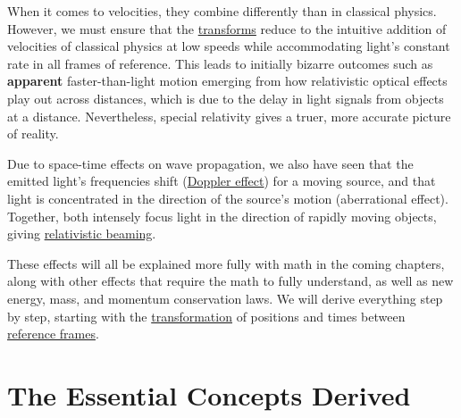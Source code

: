 When it comes to velocities, they combine differently than in classical physics.
However, we must ensure that the \hyperlink{def-transform}{transforms} reduce to the intuitive addition of velocities of classical physics at low speeds while accommodating light's constant rate in all frames of reference.
This leads to initially bizarre outcomes such as \textbf{apparent} faster-than-light motion emerging from how relativistic optical effects play out across distances, which is due to the delay in light signals from objects at a distance.
Nevertheless, special relativity gives a truer, more accurate picture of reality.

Due to space-time effects on wave propagation, we also have seen that the emitted light's frequencies shift (\hyperlink{def-doppler-effect}{Doppler effect}) for a moving source, and that light is concentrated in the direction of the source's motion (aberrational effect).
Together, both intensely focus light in the direction of rapidly moving objects, giving \hyperlink{def-relativistic-beaming}{relativistic beaming}.

These effects will all be explained more fully with math in the coming chapters, along with other effects that require the math to fully understand, as well as new energy, mass, and momentum conservation laws.
We will derive everything step by step, starting with the \hyperlink{def-transform}{transformation} of positions and times between \hyperlink{def-Reference-frame}{reference frames}.

\printbibliography[segment=\therefsegment, heading=subbibliography] %





\part{The Essential Concepts Derived} %

